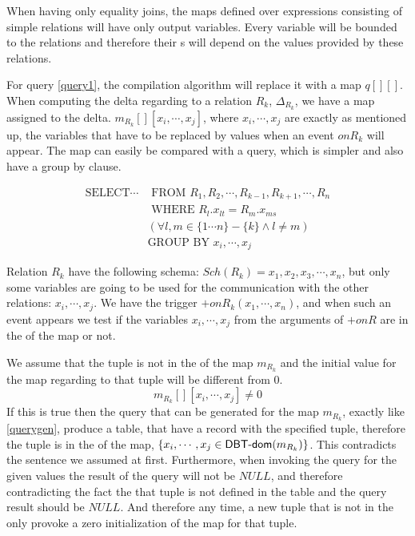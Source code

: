 \documentclass[12pt]{article}
\begin{document}
When having only equality joins, the maps defined over expressions consisting of simple relations will have only output variables. Every variable will be bounded to the relations and therefore their \dom{}s will depend on the values provided by these relations.

For query \eqref{query1}, the compilation algorithm will replace it with a map $q[][]$. When computing the delta regarding to a relation $R_k$, $\Delta_{R_k}$, we have a map assigned to the delta. $m_{R_k}[][x_i,\cdots,x_j]$, where $x_i,\cdots,x_j$ are exactly as mentioned up, the variables that have to be replaced by values when an event $onR_k$ will appear. The map can easily be compared with a query, which is simpler and also have a group by clause.

\begin{align}
\text{SELECT}\cdots&\text{ FROM }R_1,R_2,\cdots,R_{k-1},R_{k+1},\cdots,R_n\label{querygen}\\
&\text{ WHERE }R_l.x_{lt}=R_m.x_{ms}\nonumber\\
&(\forall l,m\in\{1\cdots n\}-\{k\}\land l\not=m)\nonumber\\
&\text{GROUP BY } x_i,\cdots,x_j\nonumber
\end{align}
	
Relation $R_k$ have the following schema: $Sch(R_k)={x_1,x_2,x_3,\cdots,x_n}$, but only some variables are going to be used for the communication with the other relations: $x_i,\cdots,x_j$. We  have the trigger $+onR_k(x_1,\cdots,x_n)$, and when such an event appears we  test if the variables $x_i,\cdots,x_j$ from the arguments of $+onR$ are in the \dom{} of the map or not. 
	
We assume that the tuple is not in the \dom{} of the map $m_{R_k}$ and the initial value for the map regarding to that tuple will be different from 0.
$$m_{R_k}[][x_i,\cdots,x_j]\not= 0$$
If this is true then the query that can be generated for the map $m_{R_k}$, exactly like \eqref{querygen}, produce a table, that have a record with the specified tuple, therefore the tuple is in the \dom{} of the map, $\{x_i,\cdots,x_j\in \textsf{DBT-dom}(m_{R_k}) \}$. This contradicts the sentence we assumed at first. Furthermore, when invoking the query for the given values the result of the query will not be $NULL$, and therefore contradicting the fact the that tuple is not defined in the table and the query result should be $NULL$. And therefore any time, a new tuple that is not in the \dom{} only provoke a zero initialization of the map for that tuple.
\end{document}

